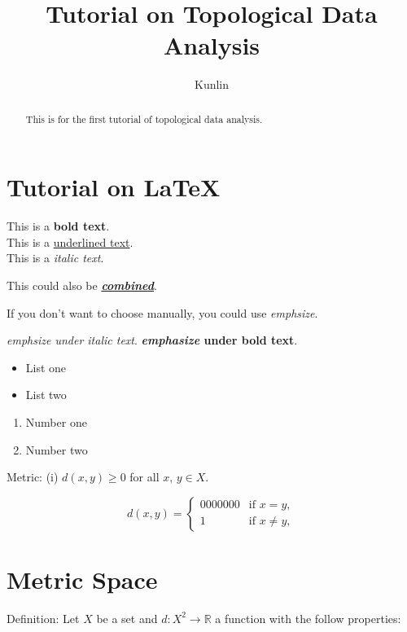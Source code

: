 \documentclass[12pt,a4paper]{article}
\theoremstyle{plain}
\begin{document}
\title{Tutorial on Topological Data Analysis}
\author{Kunlin}
\maketitle

\tableofcontents

\begin{abstract}
    This is for the first tutorial of topological data analysis. 
\end{abstract}

\section{Tutorial on \LaTeX}

This is a \textbf{bold text}. \\
This is a \underline{underlined text}. \\
This is a \textit{italic text}. 

This could  also be \underline{\textbf{\textit{combined}}}.

If you don't want to choose manually, you could use \emph{emphsize}. 

\textit{\emph{emphsize} under italic text}. 
\textbf{\emph{emphasize} under bold text}. 

\begin{itemize}
    \item List one
    \item List two
\end{itemize}

\begin{enumerate}
    \item Number one
    \item Number two
\end{enumerate}

Metric: (i) $d(x,y) \geq 0$ for all $x,\,y \in X$.

\begin{equation}
    d(x,y) = 
    \begin{cases}
        0000000&\text{if $x=y$},\\
        1&\text{if $x\neq y$},
    \end{cases}
\end{equation}

\section{Metric Space}
Definition: Let $X$ be a set and $d:X^{2}\rightarrow{\mathbb R}$ a function with the follow properties:
\end{document}
